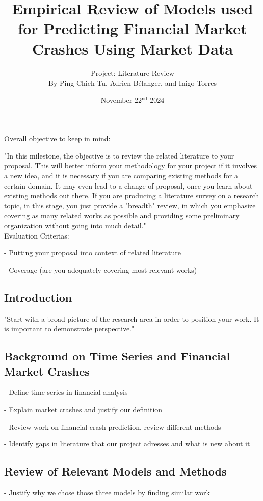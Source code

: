 \documentclass[12pt, letterpaper]{article}
\title{Empirical Review of Models used for Predicting Financial Market Crashes Using Market Data}
\author{\large Project: Literature Review \vspace{0.75em} \\ \normalsize By Ping-Chieh Tu, Adrien Bélanger, and Inigo Torres}
\date{November 22$^{\text{nd}}$ 2024}
\begin{document}
\maketitle 

\justifying %

Overall objective to keep in mind:

"In this milestone, the objective is to review the related literature to your proposal. This will better inform your methodology for your project if it involves a new idea, and it is necessary if you are comparing existing methods for a certain domain. It may even lead to a change of proposal, once you learn about existing methods out there. If you are producing a literature survey on a research topic, in this stage, you just provide a "breadth" review, in which you emphasize covering as many related works as possible and providing some preliminary organization without going into much detail."\\

Evaluation Criterias:

- Putting your proposal into context of related literature

- Coverage (are you adequately covering most relevant works)

\subsection*{Introduction}
"Start with a broad picture of the research area in order to position your work. It is important to demonstrate perspective."

\subsection*{Background on Time Series and Financial Market Crashes}

- Define time series in financial analysis

- Explain market crashes and justify our definition

- Review work on financial crash prediction, review different methods

- Identify gaps in literature that our project adresses and what is new about it

\subsection*{Review of Relevant Models and Methods}
- Justify why we chose those three models by finding similar work
\end{document}
